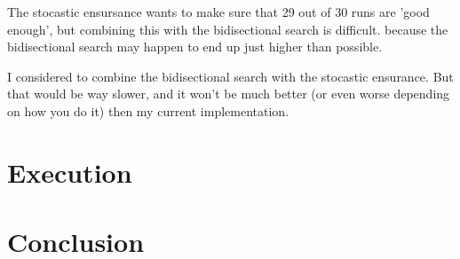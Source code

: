 \documentclass{article}
\begin{document}
The stocastic ensursance wants to make sure that 29 out of 30 runs are
'good enough', but combining this with the bidisectional search is difficult.
because the bidisectional search may happen to end up just higher than possible.

I considered to combine the bidisectional search with the stocastic ensurance.
But that would be way slower, and it won't be much better (or even worse depending
on how you do it) then my current implementation.

\section{Execution}

\section{Conclusion}
\end{document}

